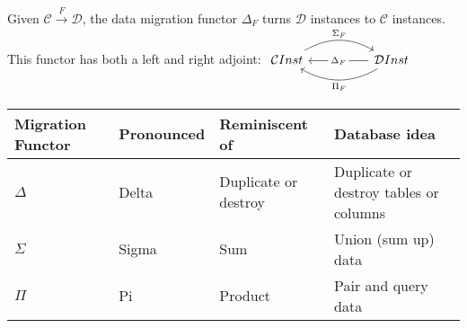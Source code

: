 Given $\mathcal{C}\xrightarrow{F}\mathcal{D}$, the data migration functor $\Delta_F$ turns $\mathcal{D}$ instances to $\mathcal{C}$ instances. This functor has both a left and right adjoint: $\begin{tikzcd}\mathcal{C}Inst \arrow[rr, "\Sigma_F", bend left] &  & \mathcal{D}Inst \arrow[ll, "\Delta_F"description] \arrow[ll, "\Pi_F", bend left]\end{tikzcd}$

\begin{minipage}{0.48\textwidth}
  \begin{tabular}{|l|l|l|l|}
    \hline
    Migration Functor & Pronounced & Reminiscent of       & Database idea                          \\ \hline
    $\Delta$          & Delta      & Duplicate or destroy & Duplicate or destroy tables or columns \\ \hline
    $\Sigma$          & Sigma      & Sum                  & Union (sum up) data                    \\ \hline
    $\Pi$             & Pi         & Product              & Pair and query data                    \\ \hline
  \end{tabular}
\end{minipage}
